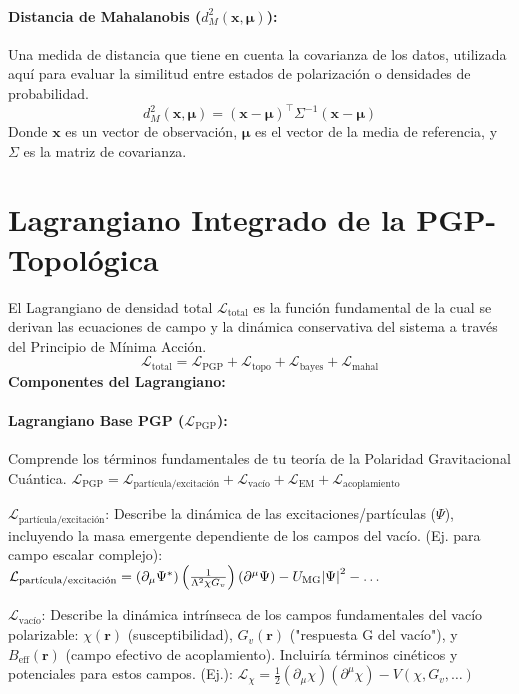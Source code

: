\documentclass{book}
\begin{document}
\paragraph{Distancia de Mahalanobis ($d_M^2(\mathbf{x},\boldsymbol{\mu})$):} Una medida de distancia que tiene en cuenta la covarianza de los datos, utilizada aquí para evaluar la similitud entre estados de polarización o densidades de probabilidad.
\begin{equation}
    d_M^2(\mathbf{x},\boldsymbol{\mu})=(\mathbf{x}-\boldsymbol{\mu})^{\top}\Sigma^{-1}(\mathbf{x}-\boldsymbol{\mu})
\end{equation}
Donde $\mathbf{x}$ es un vector de observación, $\boldsymbol{\mu}$ es el vector de la media de referencia, y $\Sigma$ es la matriz de covarianza.

\section{Lagrangiano Integrado de la PGP-Topológica}
El Lagrangiano de densidad total $\mathcal{L}_{\text{total}}$ es la función fundamental de la cual se derivan las ecuaciones de campo y la dinámica conservativa del sistema a través del Principio de Mínima Acción.
\begin{equation}
    \mathcal{L}_{\text{total}}=\mathcal{L}_{\text{PGP}}+\mathcal{L}_{\text{topo}}+\mathcal{L}_{\text{bayes}}+\mathcal{L}_{\text{mahal}}
\end{equation}
\textbf{Componentes del Lagrangiano:}

\paragraph{Lagrangiano Base PGP ($\mathcal{L}_{\text{PGP}}$):} Comprende los términos fundamentales de tu teoría de la Polaridad Gravitacional Cuántica.
$\mathcal{L}_{\text{PGP}}=\mathcal{L}_{\text{partícula/excitación}}+\mathcal{L}_{\text{vacío}}+\mathcal{L}_{\text{EM}}+\mathcal{L}_{\text{acoplamiento}}$

$\mathcal{L}_{\text{partícula/excitación}}$: Describe la dinámica de las excitaciones/partículas ($\Psi$), incluyendo la masa emergente dependiente de los campos del vacío. (Ej. para campo escalar complejo):
$\mathcal{L}_{\text{partícula/excitación}}=(\partial_\mu\Psi^*)\left(\frac{1}{\Lambda^2\chi G_v}\right)(\partial^\mu\Psi)-U_{\text{MG}}\abs{\Psi}^2-\ldots$

$\mathcal{L}_{\text{vacío}}$: Describe la dinámica intrínseca de los campos fundamentales del vacío polarizable: $\chi(\mathbf{r})$ (susceptibilidad), $G_v(\mathbf{r})$ ("respuesta G del vacío"), y $B_{\text{eff}}(\mathbf{r})$ (campo efectivo de acoplamiento). Incluiría términos cinéticos y potenciales para estos campos. (Ej.):
$\mathcal{L}_\chi=\frac{1}{2}(\partial_\mu\chi)(\partial^\mu\chi)-V(\chi,G_v,\ldots)$
\end{document}
